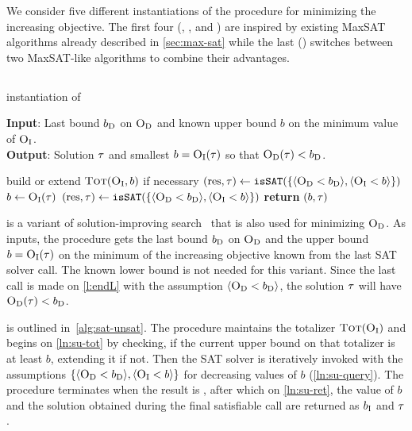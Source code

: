 We consider five different instantiations of the \Min{} procedure for minimizing the increasing objective.
The first four (\satunsat{}, \unsatsat{}, \msu{} and \oll{}) are inspired by existing MaxSAT algorithms already described in \cref{sec:max-sat} while the last (\msh{}) switches between two MaxSAT-like algorithms to combine their advantages.

\subsection{\satunsat{}\label{sec:sat-unsat}}

\begin{algorithm}[t]
  \caption{\satunsat{} instantiation of \Min{}}\label{alg:sat-unsat}
  \textbf{Input}: Last bound $b_{\text{D}}$ on $\textsc{O}_{\text{D}}$ and known upper bound $b$ on the minimum value of $\textsc{O}_{\text{I}}$. \\
  \textbf{Output}: Solution $\tau$ and smallest $b=\textsc{O}_{\text{I}}(\tau)$ so that $\textsc{O}_{\text{D}}(\tau)<b_{\text{D}}$.

  \begin{algorithmic}[1]
    \STATE build or extend $\textsc{Tot}(\textsc{O}_{\text{I}},b)$ if necessary \label{ln:su-tot}
    \STATE $(\text{res},\tau) \gets \texttt{isSAT}(\{\langle \textsc{O}_{\text{D}} < b_{\text{D}} \rangle, \langle \textsc{O}_{\text{I}} < b \rangle\})$
    \WHILE{$\res = \sat$}
      \STATE $b \gets \textsc{O}_{\text{I}}(\tau)$
      \STATE $(\text{res},\tau) \gets \texttt{isSAT}(\{\langle \textsc{O}_{\text{D}} < b_{\text{D}} \rangle, \langle \textsc{O}_{\text{I}} < b \rangle\})$ \label{ln:su-query}
    \ENDWHILE
    \STATE \textbf{return} $(b,\tau)$ \label{ln:su-ret}
  \end{algorithmic}
\end{algorithm}

\satunsat{} is a variant of solution-improving search~\autocites{handbook2-maxsat,DBLP:journals/jsat/BerreP10,DBLP:journals/jsat/EenS06} that is also used for minimizing $\textsc{O}_{\text{D}}$. 
As inputs, the procedure gets the last bound $b_{\text{D}}$ on $\textsc{O}_{\text{D}}$ and the upper bound $b=\textsc{O}_{\text{I}}(\tau)$ on the minimum of the increasing objective known from the last SAT solver call.
The known lower bound is not needed for this variant.
Since the last call is made on \cref{l:endL} with the assumption $\langle \textsc{O}_{\text{D}} < b_{\text{D}} \rangle$, the solution $\tau$ will have $\textsc{O}_{\text{D}}(\tau) < b_{\text{D}}$. 

\satunsat{} is outlined in~\cref{alg:sat-unsat}.
The procedure maintains the totalizer $\textsc{Tot}(\textsc{O}_{\text{I}})$ and begins on \cref{ln:su-tot} by checking, if the current upper bound on that totalizer is at least $b$, extending it if not. 
Then the SAT solver is iteratively invoked with the assumptions $\{\langle \textsc{O}_{\text{D}} < b_{\text{D}} \rangle, \langle \textsc{O}_{\text{I}} < b \rangle\}$ for decreasing values of $b$ (\cref{ln:su-query}).
The procedure terminates when the result is \unsat{}, after which on \cref{ln:su-ret}, the value of $b$ and the solution obtained during the final satisfiable call are returned as $b_{\text{I}}$ and $\tau$.  

